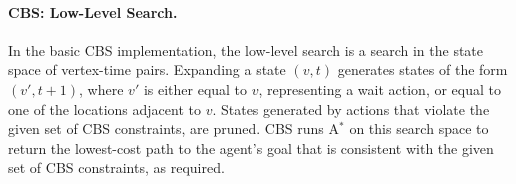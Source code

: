 \documentclass[letterpaper]{article} %
\newcommand\roni[1]{\nb{\textbf{Roni:}}{orange}{#1}}
\newcommand{\cbs}{\ac{CBS}\xspace}
\newcommand{\astar}{A$^*$\xspace}
\begin{document}


\paragraph{\cbs: Low-Level Search.}
In the basic \cbs implementation, the low-level search is a search in the state space of vertex-time pairs. 
Expanding a state $(v,t)$ generates states of the form $(v',t+1)$, where $v'$ is either equal to $v$, representing a wait action, or equal to one of the locations adjacent to $v$. 
States generated by actions that violate the given set of \cbs constraints, are pruned. 
\cbs runs \astar on this search space to return the lowest-cost path to the agent's goal that is consistent with the given set of \ac{CBS} constraints, as required.

\end{document}
